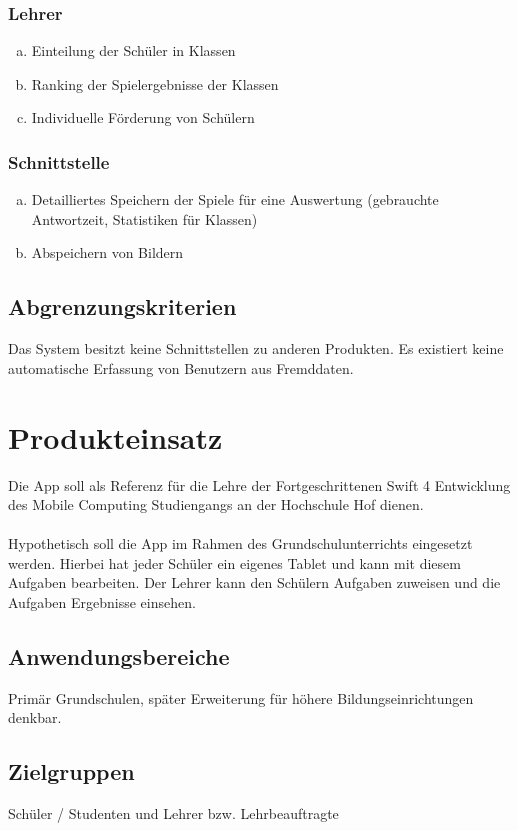 \subsubsection{Lehrer}
\begin{enumerate}[a)]
\item Einteilung der Schüler in Klassen
\item Ranking der Spielergebnisse der Klassen
\item Individuelle Förderung von Schülern
\end{enumerate}


\subsubsection{Schnittstelle}
\begin{enumerate}[a)]
\item Detailliertes Speichern der Spiele für eine Auswertung (gebrauchte Antwortzeit, Statistiken für Klassen)
\item Abspeichern von Bildern
\end{enumerate}


\subsection{Abgrenzungskriterien}
Das System besitzt keine Schnittstellen zu anderen Produkten.
Es existiert keine automatische Erfassung von Benutzern aus Fremddaten.

\section{Produkteinsatz}
Die App soll als Referenz für die Lehre der Fortgeschrittenen Swift 4 Entwicklung des Mobile Computing Studiengangs an der Hochschule Hof dienen.\\
\\
Hypothetisch soll die App im Rahmen des Grundschulunterrichts eingesetzt werden. Hierbei hat jeder Schüler ein eigenes Tablet und kann mit diesem Aufgaben bearbeiten. Der Lehrer kann den Schülern Aufgaben zuweisen und die Aufgaben Ergebnisse einsehen.  

\subsection{Anwendungsbereiche}
Primär Grundschulen, später Erweiterung für höhere Bildungseinrichtungen denkbar. 

\subsection{Zielgruppen}
Schüler / Studenten und Lehrer bzw. Lehrbeauftragte

